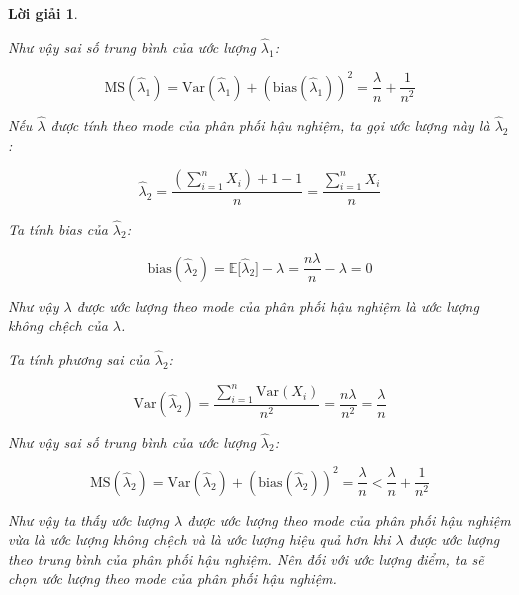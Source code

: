 \documentclass[14pt, a4paper]{article}
\theoremstyle{sltheorem}
\theoremstyle{soltheorem}
\newtheorem*{loigiai}{Lời giải}
\begin{document}
\begin{loigiai}
\begin{enumerate}
\begin{itemize}
            Như vậy sai số trung bình của ước lượng $\hat{\lambda}_1$:

            \begin{equation*}
                \text{MS}(\hat{\lambda}_1) = \text{Var}(\hat{\lambda}_1) + (\text{bias}(\hat{\lambda}_1))^2 = \dfrac{\lambda}{n} + \dfrac{1}{n^2}
            \end{equation*}

            Nếu $\hat{\lambda}$ được tính theo mode của phân phối hậu nghiệm,
            ta gọi ước lượng này là $\hat{\lambda}_2$:

            \begin{equation*}
                \hat{\lambda}_2 = \dfrac{(\sum_{i=1}^n X_i) + 1 - 1}{n} = \dfrac{\sum_{i=1}^n X_i}{n}
            \end{equation*}

            Ta tính bias của $\hat{\lambda}_2$:

            \begin{equation*}
                \text{bias}(\hat{\lambda}_2) = \mathbb{E} \lbrack \hat{\lambda}_2 \rbrack - \lambda = \dfrac{n\lambda}{n} - \lambda = 0
            \end{equation*}

            Như vậy $\lambda$ được ước lượng theo mode của phân phối hậu nghiệm là ước lượng không chệch của $\lambda$.

            Ta tính phương sai của $\hat{\lambda}_2$:

            \begin{equation*}
                \text{Var}(\hat{\lambda}_2) = \dfrac{\sum_{i=1}^n \text{Var}(X_i)}{n^2} = \dfrac{n\lambda}{n^2} = \dfrac{\lambda}{n}
            \end{equation*}

            Như vậy sai số trung bình của ước lượng $\hat{\lambda}_2$:

            \begin{equation*}
                \text{MS}(\hat{\lambda}_2) = \text{Var}(\hat{\lambda}_2) + (\text{bias}(\hat{\lambda}_2))^2 = \dfrac{\lambda}{n} < \dfrac{\lambda}{n} + \dfrac{1}{n^2}
            \end{equation*}

            Như vậy ta thấy ước lượng $\lambda$ được ước lượng theo mode của phân phối hậu nghiệm vừa là ước lượng không chệch và là ước lượng hiệu quả hơn khi $\lambda$ được ước lượng theo trung bình của phân phối hậu nghiệm.
            Nên đối với ước lượng điểm, ta sẽ chọn ước lượng theo mode của phân phối hậu nghiệm.


\end{itemize}
\end{enumerate}
\end{loigiai}
\end{document}
